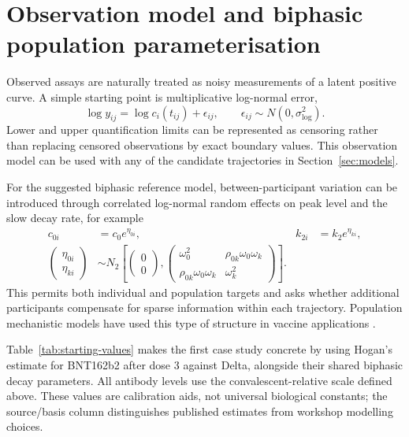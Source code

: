 \documentclass[11pt,a4paper]{article}
\begin{document}
\section{Observation model and biphasic population parameterisation}\label{sec:parameterisation}

Observed assays are naturally treated as noisy measurements of a latent positive curve. A simple
starting point is multiplicative log-normal error,
\begin{equation}
  \log y_{ij}=\log c_i(t_{ij})+\epsilon_{ij},
  \qquad \epsilon_{ij}\sim N(0,\sigma_{\log}^2).
  \label{eq:observation}
\end{equation}
Lower and upper quantification limits can be represented as censoring rather than replacing
censored observations by exact boundary values. This observation model can be used with any of
the candidate trajectories in Section~\ref{sec:models}.

For the suggested biphasic reference model, between-participant variation can be introduced
through correlated log-normal random effects on peak level and the slow decay rate, for example
\begin{align}
  c_{0i}&=c_0e^{\eta_{0i}}, & k_{2i}&=k_2e^{\eta_{ki}}, \\
  \begin{pmatrix}\eta_{0i}\\ \eta_{ki}\end{pmatrix}
  &\sim N_2\!\left[
    \begin{pmatrix}0\\0\end{pmatrix},
    \begin{pmatrix}
      \omega_0^2 & \rho_{0k}\omega_0\omega_k \\
      \rho_{0k}\omega_0\omega_k & \omega_k^2
    \end{pmatrix}\right].
  \label{eq:heterogeneity}
\end{align}
This permits both individual and population targets and asks whether additional participants
compensate for sparse information within each trajectory. Population mechanistic models have used
this type of structure in vaccine applications \parencite{pasin2019}.

Table~\ref{tab:starting-values} makes the first case study concrete by using Hogan's estimate for
BNT162b2 after dose 3 against Delta, alongside their shared biphasic decay parameters. All antibody
levels use the convalescent-relative scale defined above. These values are calibration aids, not
universal biological constants; the source/basis column distinguishes published estimates from
workshop modelling choices.
\end{document}

